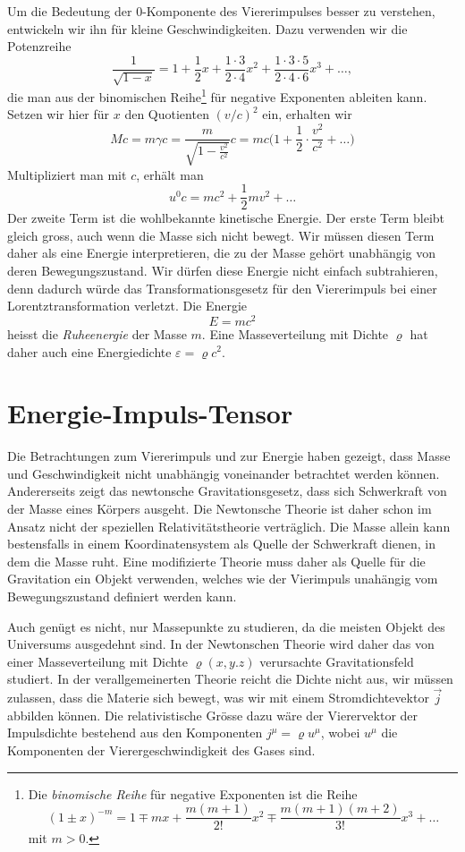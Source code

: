 Um die Bedeutung der $0$-Komponente des Viererimpulses besser zu
verstehen, entwickeln wir ihn für kleine Geschwindigkeiten.
Dazu verwenden wir die Potenzreihe
\[
\frac1{\sqrt{1-x}}
=
1+\frac12x+\frac{1\cdot 3}{2\cdot 4}x^2 + \frac{1\cdot 3\cdot 5}{2\cdot 4\cdot 6}x^3+\dots,
\]
die man aus der binomischen Reihe\footnote{%
Die {\em binomische Reihe} für negative Exponenten ist die Reihe
\[
(1\pm x)^{-m}
=
1\mp mx +\frac{m(m+1)}{2!}x^2 \mp \frac{m(m+1)(m+2)}{3!} x^3 +\dots
\]
mit $m>0$.
} für negative Exponenten ableiten kann.
Setzen wir hier für $x$ den Quotienten $(v/c)^2$ ein, erhalten wir
\[
Mc
=
m\gamma c
=
\frac{m}{\sqrt{1-\displaystyle\frac{v^2}{c^2}}} c
=
mc\biggl(1+\frac12\cdot\frac{v^2}{c^2}+\dots\biggl)
\]
Multipliziert man mit $c$, erhält man 
\[
u^0c = mc^2 + \frac12mv^2+\dots
\]
Der zweite Term ist die wohlbekannte kinetische Energie.
Der erste Term bleibt gleich gross, auch wenn die Masse sich
nicht bewegt.
Wir müssen diesen Term daher als eine Energie interpretieren, die
zu der Masse gehört unabhängig von deren Bewegungszustand.
Wir dürfen diese Energie nicht einfach subtrahieren, denn dadurch
würde das Transformationsgesetz für den Viererimpuls bei einer
Lorentztransformation verletzt.
Die Energie
\begin{equation}
E=mc^2
\label{E=mc2}
\end{equation}
heisst die {\em Ruheenergie} der Masse $m$.
Eine Masseverteilung mit Dichte $\varrho$ hat daher auch
eine Energiedichte $\varepsilon=\varrho c^2$.

\section{Energie-Impuls-Tensor}
Die Betrachtungen zum Viererimpuls und zur Energie haben gezeigt, dass
Masse und Geschwindigkeit nicht unabhängig voneinander betrachtet
werden können.
Andererseits zeigt das newtonsche Gravitationsgesetz, dass sich Schwerkraft
von der Masse eines Körpers ausgeht.
Die Newtonsche Theorie ist daher schon im Ansatz nicht der
speziellen Relativitätstheorie verträglich.
Die Masse allein kann bestensfalls in einem Koordinatensystem als
Quelle der Schwerkraft dienen, in dem die Masse ruht.
Eine modifizierte Theorie muss daher als Quelle für die Gravitation
ein Objekt verwenden, welches wie der Vierimpuls unahängig vom
Bewegungszustand definiert werden kann.

Auch genügt es nicht, nur Massepunkte zu studieren, da die meisten
Objekt des Universums ausgedehnt sind.
In der Newtonschen Theorie wird daher das von einer Masseverteilung mit
Dichte $\varrho(x,y.z)$ verursachte Gravitationsfeld studiert.
In der verallgemeinerten Theorie reicht die Dichte nicht aus,
wir müssen zulassen, dass die Materie sich bewegt, was wir mit einem
Stromdichtevektor $\vec j$ abbilden können.
Die relativistische Grösse dazu wäre der Vierervektor der Impulsdichte
bestehend aus den Komponenten $j^\mu=\varrho u^\mu$,
wobei $u^\mu$ die Komponenten der Vierergeschwindigkeit des Gases sind.

